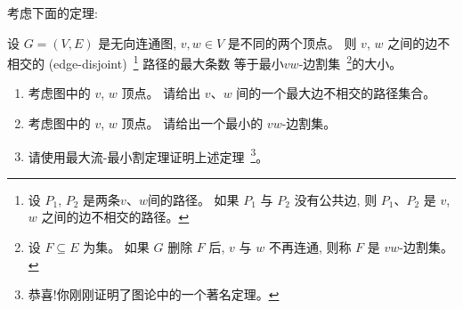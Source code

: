 \documentclass[a4paper, justified]{tufte-handout}
\begin{document}
\begin{problem}
  考虑下面的定理:
  \begin{theorem}[不能告诉你名字的某个著名定理]
    设 $G = (V, E)$ 是无向连通图, $v, w \in V$ 是不同的两个顶点。
    则 $v$, $w$ 之间的边不相交的 (edge-disjoint)~\footnote{
      设 $P_{1}$, $P_{2}$ 是两条$v$、$w$间的路径。
      如果 $P_{1}$ 与 $P_{2}$ 没有公共边,
      则 $P_{1}$、$P_{2}$ 是 $v$, $w$ 之间的边不相交的路径。
    } 路径的最大条数
    等于最小$vw$-边割集~\footnote{
      设 $F \subseteq E$ 为集。
      如果 $G$ 删除 $F$ 后, $v$ 与 $w$ 不再连通,
      则称 $F$ 是 $vw$-边割集。
    }的大小。
  \end{theorem}


  \begin{enumerate}[(1)]
    \item 考虑图中的 $v$, $w$ 顶点。
      请给出 $v$、$w$ 间的一个最大边不相交的路径集合。
    \item 考虑图中的 $v$, $w$ 顶点。
      请给出一个最小的 $vw$-边割集。
    \item 请使用最大流-最小割定理证明上述定理~\footnote{恭喜!你刚刚证明了图论中的一个著名定理。}。
  \end{enumerate}
\end{problem}
\end{document}
